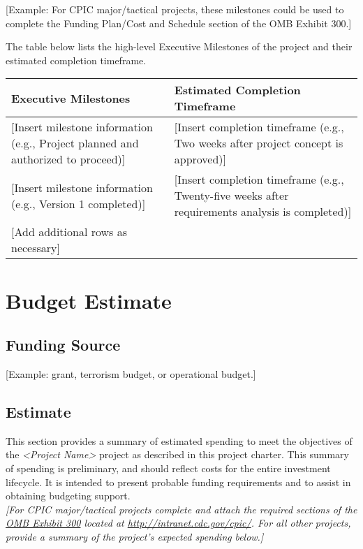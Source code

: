 \documentclass[a4paper, 11pt]{article}
\begin{document}
{[}Example: For CPIC major/tactical projects, these milestones could be
used to complete the Funding Plan/Cost and Schedule section of the OMB
Exhibit 300.{]}

The table below lists the high-level Executive Milestones of the project
and their estimated completion timeframe.

\begin{longtable}[]{@{}ll@{}}
\toprule
\textbf{Executive Milestones} & \textbf{Estimated Completion Timeframe}\tabularnewline
\midrule
\endhead
{[}Insert milestone information (e.g., Project planned and authorized to
proceed){]} & {[}Insert completion timeframe (e.g., Two weeks after
project concept is approved){]}\tabularnewline
{[}Insert milestone information (e.g., Version 1 completed){]} &
{[}Insert completion timeframe (e.g., Twenty-five weeks after
requirements analysis is completed){]}\tabularnewline
{[}Add additional rows as necessary{]} &\tabularnewline
\bottomrule
\end{longtable}

\hypertarget{budget-estimate}{%
\section{Budget Estimate}\label{budget-estimate}}

\hypertarget{funding-source}{%
\subsection{Funding Source}\label{funding-source}}

{[}Example: grant, terrorism budget, or operational budget.{]}

\hypertarget{estimate}{%
\subsection{Estimate}\label{estimate}}

This section provides a summary of estimated spending to meet the
objectives of the \emph{\textless{}Project Name\textgreater{}} project
as described in this project charter. This summary of spending is
preliminary, and should reflect costs for the entire investment
lifecycle. It is intended to present probable funding requirements and
to assist in obtaining budgeting support.\\
\emph{{[}For CPIC major/tactical projects complete and attach the
required sections of the \href{http://intranet.cdc.gov/cpic/}{OMB
Exhibit 300} located at \url{http://intranet.cdc.gov/cpic/}. For all
other projects, provide a summary of the project's expected spending}
\emph{below.{]}}
\end{document}

